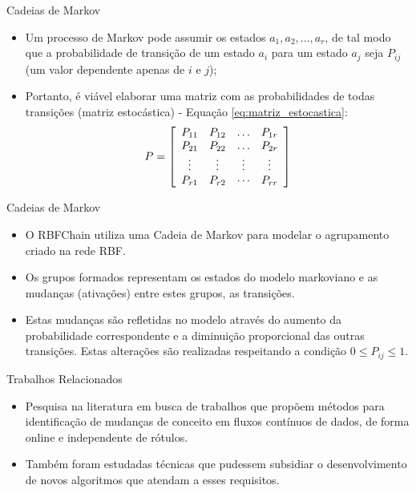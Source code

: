 \documentclass[10pt]{beamer}
\begin{document}
\begin{frame}{Cadeias de Markov}
    \begin{itemize}
        \item<1 -> Um processo de Markov pode assumir os estados $a_1, a_2, \ldots, a_r$, de tal modo que a probabilidade de transição de um estado $a_i$ para um estado $a_j$ seja $P_{ij}$ (um valor dependente apenas de $i$ e $j$);
        \item<1 -> Portanto, é viável elaborar uma matriz com as probabilidades de todas transições (matriz estocástica) - Equação \ref{eq:matriz_estocastica}:
        \begin{equation}
            \label{eq:matriz_estocastica}
            P = \left[ \begin{array} { c c c c } { P _ { 11 } } & { P _ { 12 } } & { \dots } & { P _ { 1 r } } \\ { P _ { 21 } } & { P _ { 22 } } & { \dots } & { P _ { 2 r } } \\ { \vdots } & { \vdots } & { \vdots } & { \vdots } \\ { P _ { r 1 } } & { P _ { r 2 } } & { \cdots } & { P _ { r r } } \end{array} \right]
        \end{equation}
      \end{itemize}
\end{frame}

\begin{frame}{Cadeias de Markov}
    \begin{itemize}
        \item<1 -> O RBFChain utiliza uma Cadeia de Markov para modelar o agrupamento criado na rede RBF.
        \item<2 -> Os grupos formados representam os estados do modelo markoviano e as mudanças (ativações) entre estes grupos, as transições.
        \item<3 -> Estas mudanças são refletidas no modelo através do aumento da probabilidade  correspondente e a diminuição proporcional das outras transições. Estas alterações são realizadas respeitando a condição $0 \leq P_{ij} \leq 1$.
      \end{itemize}
\end{frame}

\begin{frame}{Trabalhos Relacionados}
    \begin{itemize}
        \item<1 -> Pesquisa na literatura em busca de trabalhos que propõem métodos para identificação de mudanças de conceito em fluxos contínuos de dados, de forma online e independente de rótulos.
        \item<1 -> Também foram estudadas técnicas que pudessem subsidiar o desenvolvimento de novos algoritmos que atendam a esses requisitos.
    \end{itemize}
\end{frame}
\end{document}
